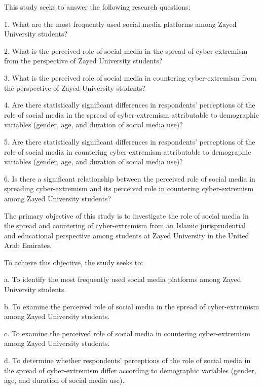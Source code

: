 \documentclass[10pt]{NSP1}
\begin{document}
\par\medskip{}\smallskip

This study seeks to answer the following research questions:

1. What are the most frequently used social media platforms among Zayed University students?

2. What is the perceived role of social media in the spread of cyber-extremism from the perspective of Zayed University students?

3. What is the perceived role of social media in countering cyber-extremism from the perspective of Zayed University students?

4. Are there statistically significant differences in respondents' perceptions of the role of social media in the spread of cyber-extremism attributable to demographic variables (gender, age, and duration of social media use)?

5. Are there statistically significant differences in respondents' perceptions of the role of social media in countering cyber-extremism attributable to demographic variables (gender, age, and duration of social media use)?

6. Is there a significant relationship between the perceived role of social media in spreading cyber-extremism and its perceived role in countering cyber-extremism among Zayed University students?

\par\medskip{}\smallskip

The primary objective of this study is to investigate the role of social media in the spread and countering of cyber-extremism from an Islamic jurisprudential and educational perspective among students at Zayed University in the United Arab Emirates.

To achieve this objective, the study seeks to:

a. To identify the most frequently used social media platforms among Zayed University students.

b. To examine the perceived role of social media in the spread of cyber-extremism among Zayed University students.

c. To examine the perceived role of social media in countering cyber-extremism among Zayed University students.

d. To determine whether respondents' perceptions of the role of social media in the spread of cyber-extremism differ according to demographic variables (gender, age, and duration of social media use).
\end{document}
